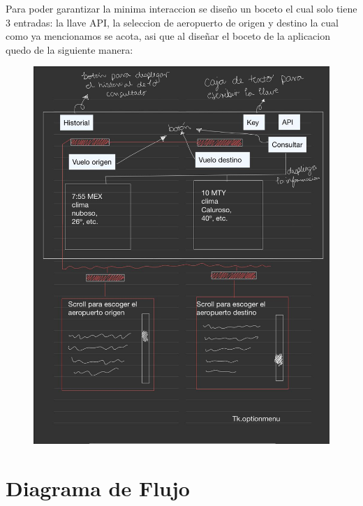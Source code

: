 \documentclass[12pt]{article}
\begin{document}
Para poder garantizar la minima interaccion se diseño un boceto el cual solo tiene 3 entradas: la llave API, la seleccion de aeropuerto de origen y destino la cual como ya mencionamos se acota, asi que al diseñar el boceto de la aplicacion quedo de la siguiente manera:
\newpage
\begin{figure}[h!]
  \centering
  \includegraphics[scale=0.35]{figures/boceto.jpeg}
  \caption{\label{fig:label} }
\end{figure}

\section{Diagrama de Flujo}

\end{document}
